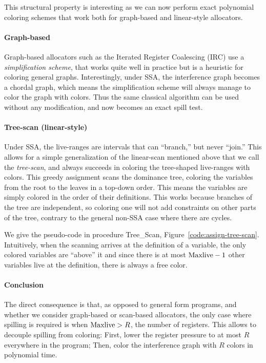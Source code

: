 {This structural property is interesting as we can now perform exact polynomial coloring schemes that work both for graph-based and linear-style allocators.


\paragraph{Graph-based} 
Graph-based allocators such as the Iterated Register Coalescing (IRC) use a \emph{simplification scheme}, that works quite well in practice but is a heuristic for coloring general graphs.
Interestingly, under SSA, the interference graph becomes a chordal graph, which means the simplification scheme will always manage to color the graph with \maxlive colors.
Thus the same classical algorithm can be used without any modification, and now becomes an exact spill test.


\paragraph{Tree-scan (linear-style)}

Under SSA, the live-ranges are intervals that can ``branch,'' but never ``join.''
This allows for a simple generalization of the linear-scan mentioned above that we call the \emph{tree-scan},
and always succeeds in coloring the tree-shaped live-ranges with \maxlive colors.
This greedy assignment scans the dominance tree, coloring the variables from the root to the leaves in a top-down order. 
This means the variables are simply colored in the order of their definitions.
This works because branches of the tree are independent, so coloring one will not add constraints on other parts of the tree, contrary to the general non-SSA case where there are cycles.

We give the pseudo-code in procedure Tree\_Scan, Figure~\ref{code:assign-tree-scan}.
Intuitively, when the scanning arrives at the definition of a variable, the only colored variables are ``above'' it and since there is at most $\mathrm{Maxlive}-1$ other variables live at the definition, there is always a free color. 

\paragraph{Conclusion}

The direct consequence is that, as opposed to general form programs, and whether we consider graph-based or scan-based allocators, the only case where spilling is required is when $\mathrm{Maxlive} > R$, the number of registers.
This allows to decouple spilling from coloring: 
First, lower the register pressure to at most $R$ everywhere in the program; 
Then, color the interference graph with $R$ colors in polynomial time.


}
